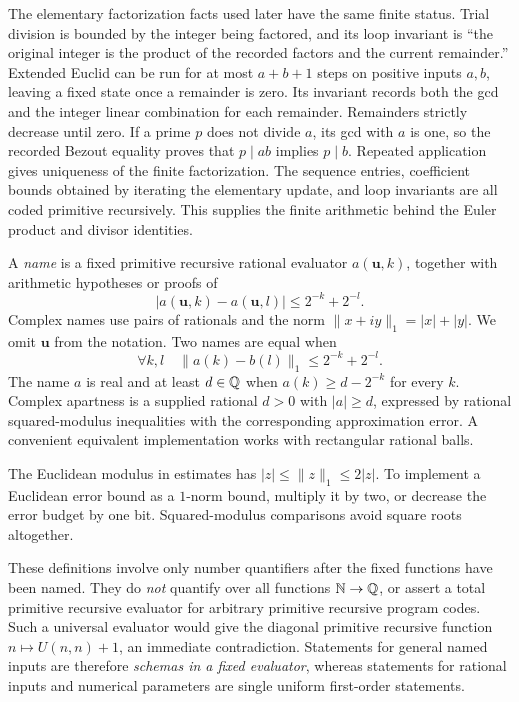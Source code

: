 The elementary factorization facts used later have the same finite
status. Trial division is bounded by the integer being factored, and
its loop invariant is ``the original integer is the product of the
recorded factors and the current remainder.'' Extended Euclid can be
run for at most $a+b+1$ steps on positive inputs $a,b$, leaving a fixed
state once a remainder is zero. Its invariant records both the gcd and
the integer linear combination for each remainder. Remainders strictly
decrease until zero. If a prime $p$ does not divide $a$, its gcd with
$a$ is one, so the recorded Bezout equality proves that $p\mid ab$
implies $p\mid b$. Repeated application gives uniqueness of the finite
factorization. The sequence entries, coefficient bounds obtained by
iterating the elementary update, and loop invariants are all coded
primitive recursively. This supplies the finite arithmetic behind the
Euler product and divisor identities.

A \emph{name} is a fixed primitive recursive rational evaluator
$a(\mathbf u,k)$, together with arithmetic hypotheses or proofs of
\[
 |a(\mathbf u,k)-a(\mathbf u,l)|\le2^{-k}+2^{-l}.
 \tag{F1}\label{eq:regular}
\]
Complex names use pairs of rationals and the norm
$\|x+iy\|_1=|x|+|y|$. We omit $\mathbf u$ from the notation.
Two names are equal when
\[
 \forall k,l\quad \|a(k)-b(l)\|_1\le2^{-k}+2^{-l}.
 \tag{F2}\label{eq:name-equality}
\]
The name $a$ is real and at least $d\in\mathbb Q$ when
$a(k)\ge d-2^{-k}$ for every $k$. Complex apartness is a supplied rational
$d>0$ with $|a|\ge d$, expressed by rational squared-modulus inequalities
with the corresponding approximation error. A convenient equivalent
implementation works with rectangular rational balls.

The Euclidean modulus in estimates has
$|z|\le\|z\|_1\le2|z|$. To implement a Euclidean error bound as a
$1$-norm bound, multiply it by two, or decrease the error budget by one
bit. Squared-modulus comparisons avoid square roots altogether.

These definitions involve only number quantifiers after the fixed
functions have been named. They do \emph{not} quantify over all functions
$\mathbb N\to\mathbb Q$, or assert a total primitive recursive evaluator for arbitrary
primitive recursive program codes. Such a universal evaluator would give
the diagonal primitive recursive function $n\mapsto U(n,n)+1$, an
immediate contradiction. Statements for general named inputs are therefore
\emph{schemas in a fixed evaluator}, whereas statements for rational
inputs and numerical parameters are single uniform first-order statements.

